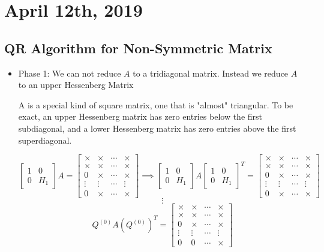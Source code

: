 \documentclass[../main/main.tex]{subfiles}
\begin{document}
\section{April 12th, 2019}
\subsection{QR Algorithm for Non-Symmetric Matrix}
\begin{itemize}
	\item Phase 1: We can not reduce $A$ to a tridiagonal matrix. Instead we reduce $A$ to an upper Hessenberg Matrix
		\begin{definition}
			A  is a special kind of square matrix, one that is "almost" triangular. To be exact, an upper Hessenberg matrix has zero entries below the first subdiagonal, and a lower Hessenberg matrix has zero entries above the first superdiagonal.
		\end{definition}
	\[
		\begin{bmatrix} 1&0\\0&H_1 \end{bmatrix} A = \begin{bmatrix} \times &\times &\cdots & \times \\ \times&\times &\cdots &\times \\ 0 &\times &\cdots &\times \\ \vdots &\vdots&\cdots&\vdots\\0&\times &\cdots&\times   \end{bmatrix} 
		\implies \begin{bmatrix}  1&0\\0&H_1 \end{bmatrix} A \begin{bmatrix} 1&0\\0&H_1 \end{bmatrix} ^{T}=\begin{bmatrix} \times &\times &\cdots & \times \\ \times&\times &\cdots &\times \\ 0 &\times &\cdots &\times \\ \vdots &\vdots&\cdots&\vdots\\0&\times &\cdots&\times   \end{bmatrix} \]\[
	\vdots
	\]\[
Q^{(0)}A\left( Q^{(0)} \right) ^{T}=\begin{bmatrix} \times &\times &\cdots & \times \\ \times&\times &\cdots &\times \\ 0 &\times &\cdots &\times \\ \vdots &\vdots&\cdots&\vdots\\0&0&\cdots&\times  \end{bmatrix} 
\]
\end{itemize}
\end{document}

